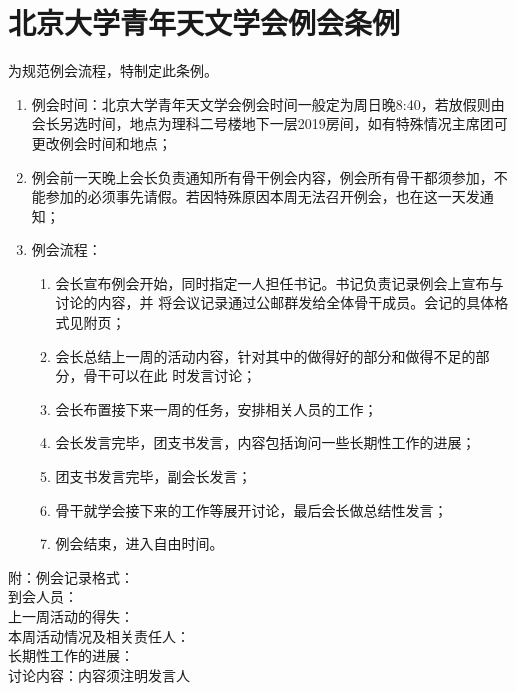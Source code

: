 \chapter{北京大学青年天文学会例会条例}

为规范例会流程，特制定此条例。

\begin{enumerate}
    \item 例会时间：北京大学青年天文学会例会时间一般定为周日晚8:40，若放假则由会长另选时间，地点为理科二号楼地下一层2019房间，如有特殊情况主席团可更改例会时间和地点；
    
    \item 例会前一天晚上会长负责通知所有骨干例会内容，例会所有骨干都须参加，不能参加的必须事先请假。若因特殊原因本周无法召开例会，也在这一天发通知；
    
    \item 例会流程：
    
    \begin{enumerate}
        \item 会长宣布例会开始，同时指定一人担任书记。书记负责记录例会上宣布与讨论的内容，并 将会议记录通过公邮群发给全体骨干成员。会记的具体格式见附页；
        \item 会长总结上一周的活动内容，针对其中的做得好的部分和做得不足的部分，骨干可以在此 时发言讨论；
        \item 会长布置接下来一周的任务，安排相关人员的工作；
        \item 会长发言完毕，团支书发言，内容包括询问一些长期性工作的进展；
        \item 团支书发言完毕，副会长发言；
        \item 骨干就学会接下来的工作等展开讨论，最后会长做总结性发言；
        \item 例会结束，进入自由时间。
    \end{enumerate}
    
\end{enumerate}

\noindent 附：例会记录格式：\\
到会人员：\\
上一周活动的得失：\\
本周活动情况及相关责任人：\\
长期性工作的进展：\\
讨论内容：内容须注明发言人
